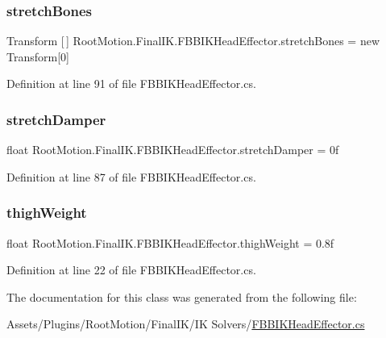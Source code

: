 \subsubsection{\texorpdfstring{stretch\+Bones}{stretchBones}}
{\footnotesize\ttfamily Transform \mbox{[}$\,$\mbox{]} Root\+Motion.\+Final\+I\+K.\+F\+B\+B\+I\+K\+Head\+Effector.\+stretch\+Bones = new Transform\mbox{[}0\mbox{]}}



Definition at line 91 of file F\+B\+B\+I\+K\+Head\+Effector.\+cs.

\mbox{\label{class_root_motion_1_1_final_i_k_1_1_f_b_b_i_k_head_effector_a048ab15b5256bef7979ed26173e4da99}} 
\subsubsection{\texorpdfstring{stretch\+Damper}{stretchDamper}}
{\footnotesize\ttfamily float Root\+Motion.\+Final\+I\+K.\+F\+B\+B\+I\+K\+Head\+Effector.\+stretch\+Damper = 0f}



Definition at line 87 of file F\+B\+B\+I\+K\+Head\+Effector.\+cs.

\mbox{\label{class_root_motion_1_1_final_i_k_1_1_f_b_b_i_k_head_effector_abe631892a2fb5c20ac437afd5a5aa9da}} 
\subsubsection{\texorpdfstring{thigh\+Weight}{thighWeight}}
{\footnotesize\ttfamily float Root\+Motion.\+Final\+I\+K.\+F\+B\+B\+I\+K\+Head\+Effector.\+thigh\+Weight = 0.\+8f}



Definition at line 22 of file F\+B\+B\+I\+K\+Head\+Effector.\+cs.



The documentation for this class was generated from the following file\+:\begin{DoxyCompactItemize}
\item 
Assets/\+Plugins/\+Root\+Motion/\+Final\+I\+K/\+I\+K Solvers/\mbox{\hyperlink{_f_b_b_i_k_head_effector_8cs}{F\+B\+B\+I\+K\+Head\+Effector.\+cs}}\end{DoxyCompactItemize}
